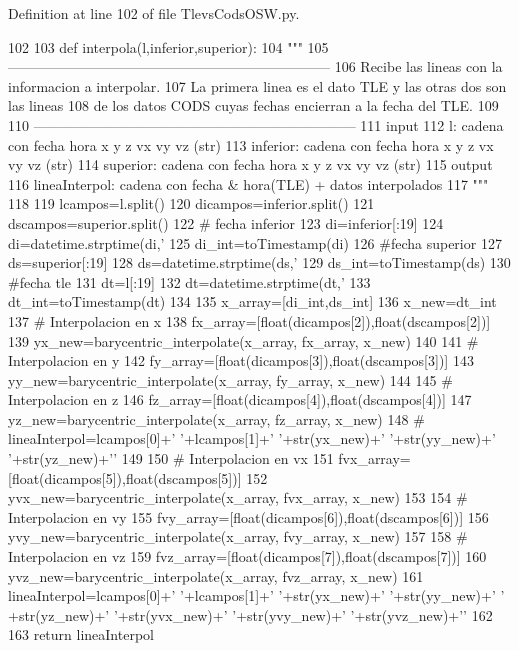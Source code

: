 \-Definition at line 102 of file \-Tlevs\-Cods\-O\-S\-W.\-py.


\begin{DoxyCode}
102 
103 def interpola(l,inferior,superior):
104     """
105     ---------------------------------------------------------------------
106     Recibe las lineas con la informacion a interpolar.
107     La primera linea es el dato TLE y las otras dos son las lineas
108     de los datos CODS cuyas fechas encierran a la fecha del TLE.
109 
110     ---------------------------------------------------------------------
111     input
112         l: cadena con fecha hora x y z vx vy vz (str)
113         inferior: cadena con fecha hora x y z vx vy vz (str)
114         superior: cadena con fecha hora x y z vx vy vz (str)
115     output
116         lineaInterpol: cadena con fecha & hora(TLE) + datos interpolados 
117     """
118 
119     lcampos=l.split()
120     dicampos=inferior.split()
121     dscampos=superior.split()
122     # fecha inferior
123     di=inferior[:19]
124     di=datetime.strptime(di,'%
125     di_int=toTimestamp(di)
126     #fecha superior
127     ds=superior[:19]
128     ds=datetime.strptime(ds,'%
129     ds_int=toTimestamp(ds)
130     #fecha tle
131     dt=l[:19]
132     dt=datetime.strptime(dt,'%
133     dt_int=toTimestamp(dt)
134     
135     x_array=[di_int,ds_int]
136     x_new=dt_int
137     # Interpolacion en x
138     fx_array=[float(dicampos[2]),float(dscampos[2])]
139     yx_new=barycentric_interpolate(x_array, fx_array, x_new)
140 
141     # Interpolacion en y
142     fy_array=[float(dicampos[3]),float(dscampos[3])]
143     yy_new=barycentric_interpolate(x_array, fy_array, x_new)
144     
145     # Interpolacion en z
146     fz_array=[float(dicampos[4]),float(dscampos[4])]
147     yz_new=barycentric_interpolate(x_array, fz_array, x_new)
148 #    lineaInterpol=lcampos[0]+' '+lcampos[1]+' '+str(yx_new)+' '+str(yy_new)+'
       '+str(yz_new)+'\n'
149     
150     # Interpolacion en vx
151     fvx_array=[float(dicampos[5]),float(dscampos[5])]
152     yvx_new=barycentric_interpolate(x_array, fvx_array, x_new)
153  
154     # Interpolacion en vy
155     fvy_array=[float(dicampos[6]),float(dscampos[6])]
156     yvy_new=barycentric_interpolate(x_array, fvy_array, x_new)
157      
158     # Interpolacion en vz
159     fvz_array=[float(dicampos[7]),float(dscampos[7])]
160     yvz_new=barycentric_interpolate(x_array, fvz_array, x_new)
161     lineaInterpol=lcampos[0]+' '+lcampos[1]+' '+str(yx_new)+' '+str(yy_new)+' '
      +str(yz_new)+' '+str(yvx_new)+' '+str(yvy_new)+' '+str(yvz_new)+'\n'
162     
163     return lineaInterpol

\end{DoxyCode}



